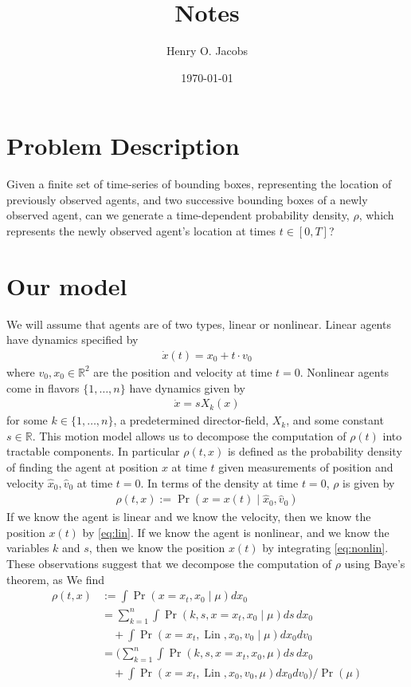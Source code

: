\documentclass[12pt]{amsart}
\title{Notes}
\author{Henry O. Jacobs}
\date{\today}
\DeclareMathOperator{\Lin}{Lin}
\begin{document}
\maketitle
\tableofcontents

\section{Problem Description}
Given a finite set of time-series of bounding boxes, representing the location of previously observed agents, and
two successive bounding boxes of a newly observed agent, can we generate a time-dependent probability density, $\rho$, which represents the
newly observed agent's location at times $t \in [0, T]$?

\section{Our model}
We will assume that agents are of two types, linear or nonlinear.  Linear agents have dynamics specified by
\begin{align}
	\dot{x} (t)= x_0 + t \cdot v_0 \label{eq:lin}
\end{align}
where $v_0, x_0 \in \mathbb{R}^2$ are the position and velocity at time $t=0$.
Nonlinear agents come in flavors $\{1,\dots,n\}$ have dynamics given by
\begin{align}
	\dot{x} = s X_k(x) \label{eq:nonlin}
\end{align}
for some $k \in \{1,\dots,n\}$, a predetermined director-field, $X_k$, and some constant $s \in \mathbb{R}$.
This motion model allows us to decompose the computation of $\rho(t)$ into tractable components.
In particular $\rho(t,x)$ is defined as the probability density of finding the agent at position $x$ at time $t$ given measurements of position and velocity $\hat{x}_0, \hat{v}_0$ at time $t=0$.
In terms of the density at time $t=0$, $\rho$ is given by
\begin{align*}
	\rho(t,x ) := \Pr( x = x(t)\mid \hat{x}_0, \hat{v}_0 )
\end{align*}
If we know the agent is linear and we know the velocity, then we know the position $x(t)$ by \eqref{eq:lin}.
If we know the agent is nonlinear, and we know the variables $k$ and $s$, then we know the position $x(t)$ by integrating \eqref{eq:nonlin}.
These observations suggest that we decompose the computation of $\rho$ using Baye's theorem, as
We find
\begin{align*}
	\rho(t,x ) &:= \int \Pr( x = x_t, x_0 \mid \mu ) dx_0 \\
	&= \sum_{k=1}^{n} \int \Pr(k, s, x = x_t, x_0 \mid \mu ) ds \, dx_0 \\
	&\quad + \int \Pr(x = x_t, \Lin, x_0, v_0 \mid \mu ) dx_0 dv_0 \\
	&=\Big( \sum_{k=1}^{n} \int \Pr(k, s, x = x_t, x_0, \mu ) ds \, dx_0 \\
	&\quad + \int \Pr(x = x_t, \Lin, x_0, v_0, \mu ) dx_0 dv_0 \Big) / \Pr(\mu) \\
\end{align*}
\end{document}
